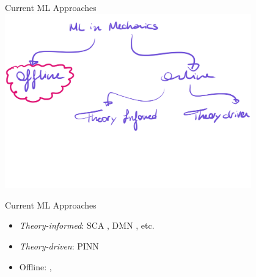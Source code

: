   \begin{frame}{Current ML Approaches}
  \centering
    \includegraphics[width=0.8\textwidth]{Figures/surrogate/ML-Mech.pdf}
  \end{frame}

  \begin{frame}{Current ML Approaches}
  \centering
  \begin{minipage}{0.8\textwidth}
      \begin{itemize}
        \item \textit{Theory-informed}: SCA \cite{Liu2016b}, DMN \cite{Liu2019a}, etc.
        \item \textit{Theory-driven}: PINN\cite{Raissi2017}
        \item Offline: \cite{Rocha2020},\cite{Bessa2017b}
      \end{itemize}
  \end{minipage}%
  \end{frame}


